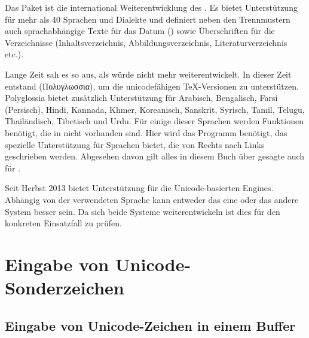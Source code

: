 Das Paket  ist die international Weiterentwicklung des .
Es bietet Unterstützung für mehr als 40 Sprachen und Dialekte und definiert neben den Trennmustern 
auch sprachabhängige Texte für das Datum () sowie Überschriften für die Verzeichnisse 
(Inhaltsverzeichnis, Abbildungsverzeichnis, Literaturverzeichnis etc.).

Lange Zeit sah es so aus, als würde  nicht mehr weiterentwickelt.
In dieser Zeit entstand  (Πολυγλωσσια), um die unicodefähigen \TeX{}-Versionen zu unterstützen.
Polyglossia bietet zusätzlich Unterstützung für Arabisch, Bengalisch, Farsi (Persisch), Hindi, Kannada, Khmer,
Koreanisch, Sanskrit, Syrisch, Tamil, Telugu, Thailändisch, Tibetisch und Urdu.
Für einige dieser Sprachen werden Funktionen benötigt, die in \LuaLaTeX{} nicht vorhanden sind.
Hier wird das Programm \XeLaTeX{} benötigt, das spezielle Unterstützung für Sprachen bietet,
die von Rechts nach Links geschrieben werden. Abgesehen davon gilt alles in diesem Buch über
\LuaLaTeX{} gesagte auch für \XeLaTeX{}.

Seit Herbst 2013 bietet  Unterstützung für die Unicode-basierten Engines.
Abhängig von der verwendeten Sprache kann entweder das eine oder das andere System besser sein.
Da sich beide Systeme weiterentwickeln ist dies für den konkreten Einsatzfall zu prüfen.


\section{Eingabe von Unicode-Sonderzeichen}
\label{unicodeeingabe}

%
\subsection{Eingabe von Unicode-Zeichen in
einem  Buffer}
\label{unicodeviaemacs}

